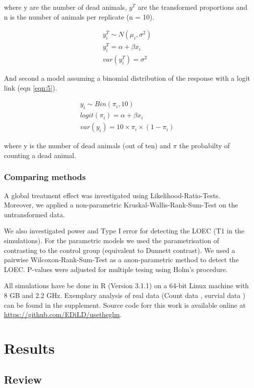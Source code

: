 \documentclass{scrartcl}\usepackage[]{graphicx}\usepackage[]{color}
\begin{document}
where y are the number of dead animals, $y^T$ are the transformed proportions and n is the number of animals per replicate (n = 10).

\begin{align}
  y^T_i \sim N(\mu_i, \sigma^2) \nonumber \\
  y^T_i = \alpha + \beta x_i \label{eqn:4} \\
  var(y^T_i) = \sigma^2 \nonumber
\end{align}

And second a model assuming a binomial distribution of the response with a logit link (eqn \ref{eqn:5}).

\begin{align}
  y_i \sim Bin(\pi_i, 10) \nonumber \\
  logit(\pi_i) = \alpha + \beta x_i \label{eqn:5} \\
  var(y_i) = 10 \times \pi_i \times (1 - \pi_i) \nonumber
\end{align}

where y is the number of dead animals (out of ten) and $\pi$ the probabilty of counting a dead animal.

\subsubsection{Comparing methods}
A global treatment effect was investigated using Likelihood-Ratio-Tests.
Moreover, we applied a non-parametric Kruskal-Wallis-Rank-Sum-Test on the untransformed data.

We also investigated power and Type I error for detecting the LOEC (T1 in the simulations).
For the parametric models we used the parametrisation of contrasting to the control group (equivalent to Dunnett contrast).
We used a pairwise Wilcoxon-Rank-Sum-Test as a anon-parametric method to detect the LOEC.
P-values were adjusted for multiple tesing using Holm's procedure.

All simulations have be done in R (Version 3.1.1) on a 64-bit Linux machine with 8 GB and 2.2 GHz.
Exemplary analysis of real data (Count data \citep{brock_minimum_2014}, survial data \citep{epa_methods_2002}) can be found in the supplement.
Source code forr this work is available online at \url{https://github.com/EDiLD/usetheglm}. 


\section{Results}
\subsection{Review}
\end{document}
